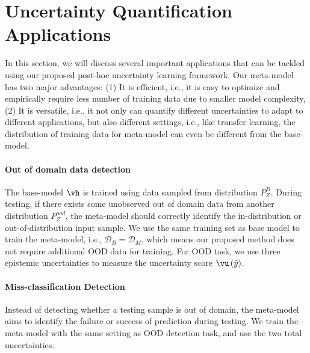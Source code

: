 \section{Uncertainty Quantification Applications}
In this section, we will discuss several important applications that can be tackled using our proposed post-hoc uncertainty learning framework. 
Our meta-model has two major advantages: (1) It is efficient, i.e., it is easy to optimize and empirically require less number of training data due to smaller model complexity, (2) It is versatile, i.e., it not only can quantify different uncertainties to adapt to different applications, but also different settings, i.e., like transfer learning, the distribution of training data for meta-model can even be different from the base-model.
\paragraph{Out of domain data detection}
The base-model $\vh$ is trained using data sampled from distribution $P^B_{Z}$. During testing, if there exists some unobserved out of domain data from another distribution $P^{ood}_{Z}$, the meta-model should correctly identify the in-distribution or out-of-distribution input sample. We use the same training set as base model to train the meta-model, i.e., $\mathcal{D}_{B} = \mathcal{D}_{M}$, which means our proposed method does not require additional OOD data for training. For OOD task, we use three epistemic uncertainties to measure the uncertainty score $\vu\left(\tilde{y}\right)$.
\paragraph{Miss-classification Detection}
Instead of detecting whether a testing sample is out of domain, the meta-model aims to identify the failure or success of prediction during testing. We train the meta-model with the same setting as OOD detection task, and use the two total uncertainties.
